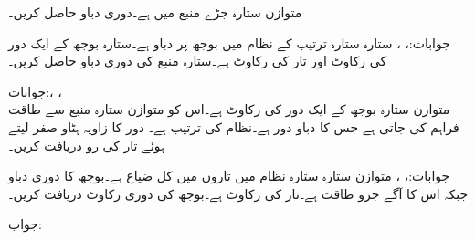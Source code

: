 متوازن  ستارہ جڑے منبع میں  ہے۔دوری دباو حاصل کریں۔

جوابات:، ، 
ستارہ ستارہ  ترتیب کے نظام میں بوجھ پر دباو  ہے۔ستارہ بوجھ کے ایک دور کی رکاوٹ  اور تار کی رکاوٹ  ہے۔ستارہ منبع کی دوری دباو حاصل کریں۔

جوابات:، ، \\ 
متوازن ستارہ بوجھ کے ایک دور کی رکاوٹ  ہے۔اس کو متوازن ستارہ منبع سے طاقت فراہم کی جاتی ہے جس کا دباو دور  ہے۔نظام کی ترتیب  ہے۔ دور  کا زاویہ ہٹاو صفر لیتے ہوئے تار کی رو دریافت کریں۔

جوابات:، ، 
متوازن ستارہ ستارہ نظام میں تاروں میں کل ضیاع  ہے۔بوجھ کا دوری دباو  جبکہ اس کا آگے جزو طاقت  ہے۔تار کی رکاوٹ  ہے۔بوجھ کی دوری رکاوٹ دریافت کریں۔

جواب:


